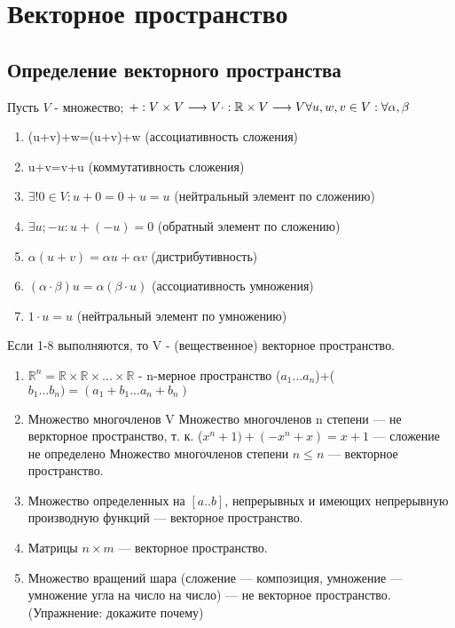 
\chapter{Векторное пространство}

\section{Определение векторного пространства}

\begin{definition}
    Пусть $V$ - множество; \newline
    $+: V \times V \longrightarrow V
    \newline
    \cdot : \mathbb{R} \times V \longrightarrow V
    \newline
    \forall u, w, v \in V: \forall \alpha , \beta$
    \begin{enumerate}
        \item (u+v)+w=(u+v)+w (ассоциативность сложения)
        \item u+v=v+u (коммутативность сложения)
        \item $\exists ! 0 \in V: u+0=0+u=u$ (нейтральный элемент по сложению)
        \item $\exists u; -u: u+(-u)=0$ (обратный элемент по сложению)
        \item $\alpha (u+v)=\alpha u+\alpha v$ (дистрибутивность)
        \item $(\alpha \cdot \beta)u=\alpha(\beta \cdot u)$ (ассоциативность умножения)
        \item $1 \cdot u=u$ (нейтральный элемент по умножению)
    \end{enumerate}
    Если 1-8 выполняются, то V - (вещественное) векторное пространство.
\end{definition}

\begin{eg}
    \begin{enumerate}
        \item $\mathbb{R}^n=\mathbb{R}\times \mathbb{R}\times ... \times \mathbb{R}$ - n-мерное пространство ($a_{1}...a_{n}$)+($b_{1}...b_{n})=(a_{1}+b_{1}...a_{n}+b_{n})$
        \item Множество многочленов V \newline
         Множество многочленов n степени --- не веркторное пространство, т. к. ($x^n+1)+(-x^n+x)=x+1$ --- сложение не определено
        \newline Множество многочленов степени $n\leqslant n$ --- векторное пространство.
        \item Множество определенных на $[a .. b]$, непрерывных и имеющих непрерывную производную функций --- векторное пространство.
        \item Матрицы $n\times m$ --- векторное пространство.
        \item Множество вращений шара (сложение --- композиция, умножение --- умножение угла на число на число) --- не векторное пространство. (Упражнение: докажите почему)
    \end{enumerate}
\end{eg}

